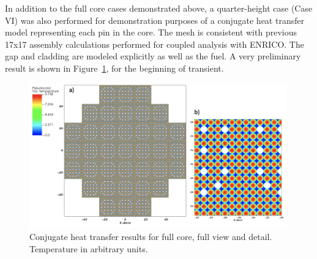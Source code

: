 In addition to the full core cases demonstrated above, a quarter-height case (Case VI) was also performed for demonstration purposes of a conjugate heat transfer model representing each pin in the core. The mesh is consistent with previous 17x17 assembly calculations performed for coupled analysis with ENRICO. The gap and cladding are modeled explicitly as well as the fuel. A very preliminary result is shown in Figure~\ref{fig:cht}, for the beginning of transient.

\begin{figure}[!ht]
\centering
\includegraphics[width=0.99\textwidth]{./figures/quarter_cht.png}
\caption{Conjugate heat transfer results for full core, full view and detail. Temperature in arbitrary units.}
\label{fig:cht}
\end{figure}
